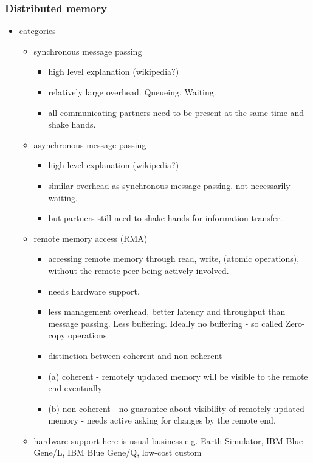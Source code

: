 \documentclass[a4paper, 10pt]{article}
\begin{document}
\subsubsection{Distributed memory}
\label{sssec:existing-means-distributed}
\begin{itemize}
	\item categories
		\begin{itemize}
			\item synchronous message passing
				\begin{itemize}
					\item high level explanation (wikipedia?)
					\item relatively large overhead. Queueing. Waiting.
					\item all communicating partners need to be present at the same time and shake hands.
				\end{itemize}
			\item asynchronous message passing
				\begin{itemize}
					\item high level explanation (wikipedia?)
					\item similar overhead as synchronous message passing. not necessarily waiting.
					\item but partners still need to shake hands for information transfer.
				\end{itemize}
			\item remote memory access (RMA)
				\begin{itemize}
					\item accessing remote memory through read, write, (atomic operations), without the remote peer being actively involved.
					\item needs hardware support.
					\item less management overhead, better latency and throughput than message passing. Less buffering. Ideally no buffering - so called Zero-copy operations.
					\item distinction between coherent and non-coherent
					\item (a) coherent - remotely updated memory will be visible to the remote end eventually
					\item (b) non-coherent - no guarantee about visibility of remotely updated memory - needs active asking for changes by the remote end.
				\end{itemize}
			\item hardware support here is usual business e.g. Earth Simulator\cite{earthsimulator}, IBM Blue Gene/L\cite{bluegenel}, IBM Blue Gene/Q\cite{bluegeneq}, low-cost custom\cite{hoefler2006b}

\end{itemize}
\end{itemize}
\end{document}
